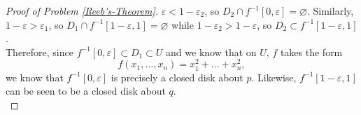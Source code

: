\documentclass[reqno]{amsart}
\theoremstyle{definition}
\theoremstyle{remark}
\begin{document}
\begin{proof}[Proof of Problem \ref{Reeb's-Theorem}]
         $\varepsilon < 1- \varepsilon_2$, so
         $D_2 \cap
         f^{-1}\left[ 0,\varepsilon \right] = \varnothing $.
         Similarly,
         $1- \varepsilon > \varepsilon_1$, so
         $D_1 \cap
         f^{-1}\left[ 1-\varepsilon,1 \right] = \varnothing$
         while $1-\varepsilon_2 > 1- \varepsilon$, so
         $D_2 
         \subset f^{-1}\left[ 1-\varepsilon,1 \right] $.\\
         \linebreak
         Therefore,
         since $f^{-1}\left[ 0,\varepsilon \right] \subset D_1
         \subset U$ and
         we know that on
         $U$, $f$ takes the form
         \[
         f\left( x_1,\ldots,x_n \right) 
         = x_1^2 + \ldots + x_n^2,
         \] 
         we know that
         $f^{-1}\left[ 0,\varepsilon \right] $ is
         precisely a closed disk about
         $p$. Likewise,
         $f^{-1}\left[ 1-\varepsilon,1 \right] $ can
         be seen to be a closed disk about $q$.\\


\end{proof}
\end{document}
